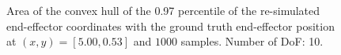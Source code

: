 \documentclass[conference]{IEEEtran}
\begin{document}
\begin{figure}[tbh]
\centering

    \caption{Area of the convex hull of the 0.97 percentile of the re-simulated end-effector coordinates with the ground truth end-effector position at $(x, y) = [5.00, 0.53]$ and $1000$ samples. Number of DoF: 10.}
\end{figure}
\end{document}
